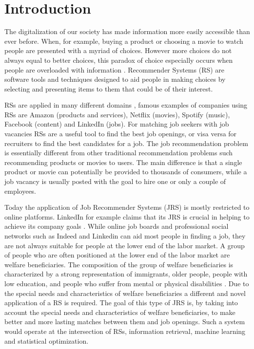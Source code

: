 \section{Introduction}
\label{sec:intro}




The digitalization of our society has made information more easily accessible than ever before.
When, for example, buying a product or choosing a movie to watch people are presented with a myriad of choices. 
However more choices do not always equal to better choices, this paradox of choice especially occurs when people are overloaded with information \cite{schwartz2004paradox}. 
Recommender Systems (RS) are software tools and techniques designed to aid people in making choices by selecting and presenting items to them that could be of their interest.

RSs are applied in many different domains \cite{aggarwal2016recommender}, famous examples of companies using RSs are Amazon (products and services), Netflix (movies), Spotify (music), Facebook (content) and LinkedIn (jobs).
For matching job seekers with job vacancies RSs are a useful tool to find the best job openings, or visa versa for recruiters to find the best candidates for a job.
The job recommendation problem is essentially different from other traditional recommendation problems such recommending products or movies to users.
The main difference is that a single product or movie can potentially be provided to thousands of consumers, while a job vacancy is usually posted with the goal to hire one or only a couple of employees.

Today the application of Job Recommender Systems (JRS) is mostly restricted to online platforms. 
LinkedIn for example claims that its JRS is crucial in helping to achieve its company goals \cite{kenthapadi2017personalized}.
While online job boards and professional social networks such as Indeed and Linkedin can aid most people in finding a job, they are not always suitable for people at the lower end of the labor market.
A group of people who are often positioned at the lower end of the labor market are welfare beneficiaries. 
The composition of the group of welfare beneficiaries is characterized by a strong representation of immigrants, older people, people with low education, and people who suffer from mental or physical disabilities \cite{dodeweerd}.
Due to the special needs and characteristics of welfare beneficiaries a different and novel application of a RS is required. 
The goal of this type of JRS is, by taking into account the special needs and characteristics of welfare beneficiaries, to make better and more lasting matches between them and job openings.
Such a system would operate at the intersection of RSs, information retrieval, machine learning and statistical optimization. 

